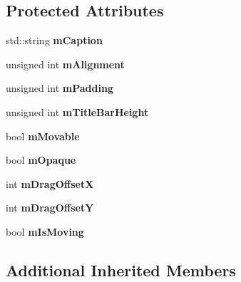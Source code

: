 \subsection*{Protected Attributes}
\begin{DoxyCompactItemize}
\item 
std\+::string {\bfseries m\+Caption}\hypertarget{classgcn_1_1Window_ae068b73ce72af093c8bd4c67ac94ec1b}{}\label{classgcn_1_1Window_ae068b73ce72af093c8bd4c67ac94ec1b}

\item 
unsigned int {\bfseries m\+Alignment}\hypertarget{classgcn_1_1Window_a728a811c36548980d35e81126f5cb64f}{}\label{classgcn_1_1Window_a728a811c36548980d35e81126f5cb64f}

\item 
unsigned int {\bfseries m\+Padding}\hypertarget{classgcn_1_1Window_ac17c4428c3aa388d5a15f3043a034ad3}{}\label{classgcn_1_1Window_ac17c4428c3aa388d5a15f3043a034ad3}

\item 
unsigned int {\bfseries m\+Title\+Bar\+Height}\hypertarget{classgcn_1_1Window_a3d0f93b51bb0245494801072f7b3a8cb}{}\label{classgcn_1_1Window_a3d0f93b51bb0245494801072f7b3a8cb}

\item 
bool {\bfseries m\+Movable}\hypertarget{classgcn_1_1Window_aeb948d8a8869fd73e9c03510a1d60928}{}\label{classgcn_1_1Window_aeb948d8a8869fd73e9c03510a1d60928}

\item 
bool {\bfseries m\+Opaque}\hypertarget{classgcn_1_1Window_a999ce21bf07e7a9d18779fd8ba41c167}{}\label{classgcn_1_1Window_a999ce21bf07e7a9d18779fd8ba41c167}

\item 
int {\bfseries m\+Drag\+OffsetX}\hypertarget{classgcn_1_1Window_a6bc881f2698954de4f68907a09e67aeb}{}\label{classgcn_1_1Window_a6bc881f2698954de4f68907a09e67aeb}

\item 
int {\bfseries m\+Drag\+OffsetY}\hypertarget{classgcn_1_1Window_a88cde45ed11259645fc59eb74092dc48}{}\label{classgcn_1_1Window_a88cde45ed11259645fc59eb74092dc48}

\item 
bool {\bfseries m\+Is\+Moving}\hypertarget{classgcn_1_1Window_a69266f11be3713c90f69fde280db9d19}{}\label{classgcn_1_1Window_a69266f11be3713c90f69fde280db9d19}

\end{DoxyCompactItemize}
\subsection*{Additional Inherited Members}


